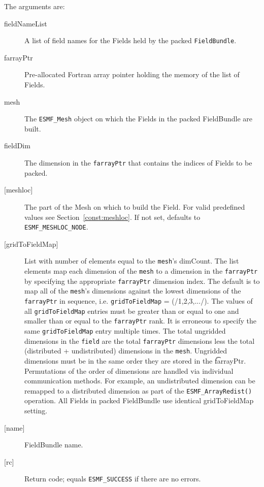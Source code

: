    The arguments are: 
   \begin{description} 
   \item [fieldNameList] 
   A list of field names for the Fields held by the packed {\tt FieldBundle}. 
   \item[farrayPtr] 
   Pre-allocated Fortran array pointer holding the memory of the list of Fields. 
   \item [mesh] 
   The {\tt ESMF\_Mesh} object on which the Fields in the packed FieldBundle are built. 
   \item [fieldDim] 
   The dimension in the {\tt farrayPtr} that contains the indices of Fields to be packed. 
   \item [{[meshloc]}] 
   \begin{sloppypar} 
   The part of the Mesh on which to build the Field. For valid 
   predefined values see Section~\ref{const:meshloc}. 
   If not set, defaults to {\tt ESMF\_MESHLOC\_NODE}. 
   \end{sloppypar} 
   \item [{[gridToFieldMap]}] 
   List with number of elements equal to the 
   {\tt mesh}'s dimCount. The list elements map each dimension 
   of the {\tt mesh} to a dimension in the {\tt farrayPtr} by 
   specifying the appropriate {\tt farrayPtr} dimension index. 
   The default is to 
   map all of the {\tt mesh}'s dimensions against the lowest dimensions of 
   the {\tt farrayPtr} in sequence, i.e. {\tt gridToFieldMap} = (/1,2,3,.../). 
   The values of all {\tt gridToFieldMap} entries must be greater than or equal 
   to one and smaller than or equal to the {\tt farrayPtr} rank. 
   It is erroneous to specify the same {\tt gridToFieldMap} entry 
   multiple times. The total ungridded dimensions in the {\tt field} 
   are the total {\tt farrayPtr} dimensions less 
   the total (distributed + undistributed) dimensions in 
   the {\tt mesh}. Ungridded dimensions must be in the same order they are 
   stored in the {\t farrayPtr}. Permutations of the order of 
   dimensions are handled via individual communication methods. For example, 
   an undistributed dimension can be remapped to a distributed dimension 
   as part of the {\tt ESMF\_ArrayRedist()} operation. 
   All Fields in packed FieldBundle use identical gridToFieldMap setting. 
   \item [{[name]}] 
   FieldBundle name. 
   \item [{[rc]}] 
   Return code; equals {\tt ESMF\_SUCCESS} if there are no errors. 
   \end{description} 
    

